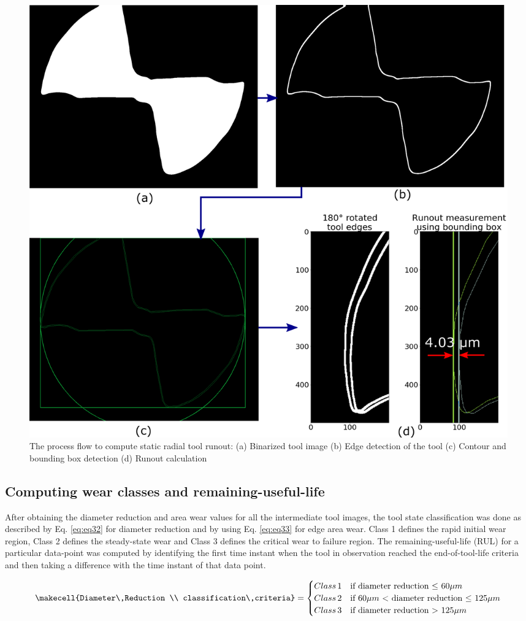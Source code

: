 \documentclass[preprint,review,12pt]{elsarticle}
\begin{document}
\begin{figure}[!h]
\begin{center}
\includegraphics[width=0.7\linewidth]{320.png}
\caption{The process flow to compute static radial tool runout: (a) Binarized tool image (b) Edge detection of the tool (c) Contour and bounding box detection (d) Runout calculation}\label{fig:fig320}
\end{center}
\end{figure}

\subsection{Computing wear classes and remaining-useful-life}\label{sec:sec44}
After obtaining the diameter reduction and area wear values for all the intermediate tool images, the tool state classification was done as described by Eq. \ref{eq:eq32} for diameter reduction and by using Eq. \ref{eq:eq33} for edge area wear. Class 1 defines the rapid initial wear region, Class 2 defines the steady-state wear and Class 3 defines the critical wear to failure region. The remaining-useful-life (RUL) for a particular data-point was computed by identifying the first time instant when the tool in observation reached the end-of-tool-life criteria and then taking a difference with the time instant of that data point. \par

\begin{equation}\label{eq:eq32}
 \makecell{Diameter\,Reduction \\ classification\,criteria} =
 \begin{cases}
   Class\,1 & \text{if diameter reduction $\leq$ $60\mu{m}$} \\
   Class\,2 & \text{if $60\mu{m}$ $<$ diameter reduction $\leq$ $125\mu{m}$} \\
   Class\,3 & \text{if diameter reduction $>$ $125\mu{m}$}
 \end{cases}
\end{equation}
\end{document}
